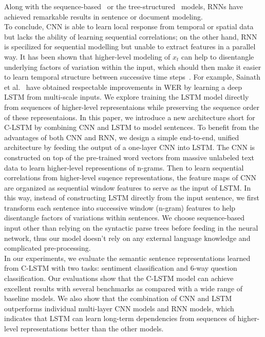 \documentclass[11pt,letterpaper]{article}
\begin{document}
Along with the sequence-based~\cite{tang} or the
tree-structured~\cite{tai2015} models, RNNs have achieved remarkable
results in sentence or document modeling.\\
\indent To conclude, CNN is able to learn local response from temporal or spatial data but lacks the ability of learning sequential correlations; on the other hand, RNN is specilized for sequential modelling but unable to extract features in a parallel way.
It has been shown that higher-level modeling of $x_t$ can help to disentangle underlying factors of variation within the input, which should then make it easier to learn temporal structure between successive time steps~\cite{evidence}. For example, Sainath et al.~\cite{saina} have obtained respectable improvements in WER by learning a deep LSTM from multi-scale  inputs.
We explore training the LSTM model directly from sequences of higher-level representaions while preserving the sequence order of these representaions.
In this paper, we introduce a new architecture short for C-LSTM by combining CNN and LSTM to model sentences.
To benefit from the advantages of both CNN and RNN, we design a simple end-to-end, unified architecture by feeding the output of a one-layer CNN into LSTM.
The CNN is constructed on top of the pre-trained word vectors from massive unlabeled text data to learn higher-level representions of n-grams.
Then to learn sequential correlations from higher-level suqence representations, the feature maps of CNN are organized as sequential window features to serve as the input of LSTM.
In this way, instead of constructing LSTM directly from the input sentence, we first transform each sentence into successive window (n-gram) features to help disentangle factors of variations within sentences.
We choose sequence-based input other than relying on the syntactic parse trees before feeding in the neural network, thus our model doesn't rely on any external language knowledge and complicated pre-processing.\\
\indent In our experiments, we evaluate the semantic sentence
representations learned from C-LSTM with two tasks: sentiment
classification and 6-way question classification. Our evaluations show
that the C-LSTM model can achieve excellent results with several benchmarks
as compared with a wide range of baseline models. We also show that the
combination of CNN and LSTM outperforms individual multi-layer CNN
models and RNN models, which indicates that LSTM can learn
long-term dependencies from sequences of higher-level representations
better than the other models.
\end{document}
